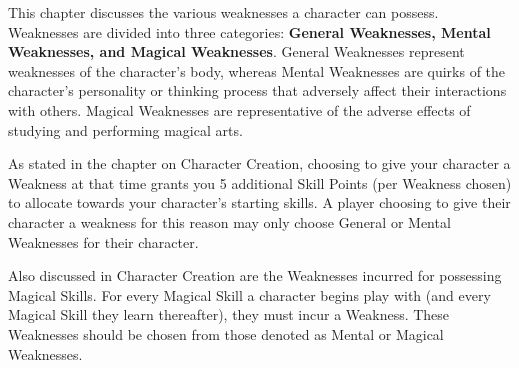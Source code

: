 \documentclass[oneside]{book}
\begin{document}
This chapter discusses the various weaknesses a character can possess. Weaknesses are divided into three categories: \textbf{General Weaknesses, Mental Weaknesses, and Magical Weaknesses}. General Weaknesses represent weaknesses of the character's body, whereas Mental Weaknesses are quirks of the character's personality or thinking process that adversely affect their interactions with others. Magical Weaknesses are representative of the adverse effects of studying and performing magical arts.

As stated in the chapter on Character Creation, choosing to give your character a Weakness at that time grants you 5 additional Skill Points (per Weakness chosen) to allocate towards your character's starting skills. A player choosing to give their character a weakness for this reason may only choose General or Mental Weaknesses for their character. 

Also discussed in Character Creation are the Weaknesses incurred for possessing Magical Skills. For every Magical Skill a character begins play with (and every Magical Skill they learn thereafter), they must incur a Weakness. These Weaknesses should be chosen from those denoted as Mental or Magical Weaknesses.
\end{document}
